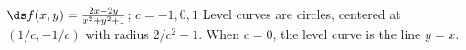 {$\ds f(x,y) = \frac{2x-2y}{x^2+y^2+1}$; $c = -1,0,1$}
{Level curves are circles, centered at $(1/c,-1/c)$ with radius $2/c^2-1$. When $c=0$, the level curve is the line $y=x$.\\
}